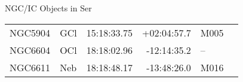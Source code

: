 \begin{block}{NGC/IC Objects in Ser}
  \centering
  \begin{tabularx}{\textwidth}{llrrll} \toprule 
    NGC5904 & GCl & 15:18:33.75 & +02:04:57.7  & M005 \\
    NGC6604 & OCl & 18:18:02.96 & -12:14:35.2  & -- \\ 
    NGC6611 & Neb & 18:18:48.17 & -13:48:26.0  & M016 \\ 
  \end{tabularx}
\end{block}
